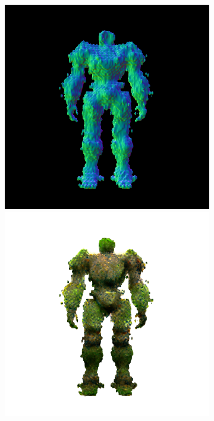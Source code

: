 \begin{figure}[ht]
\begin{subfigure}[b]{0.222\textwidth}
        \includegraphics[width=\textwidth]{etc/a robot made out of plants/magic123/magic123_refine_robot_back_0_part2.png}
        \includegraphics[width=\textwidth]{etc/a robot made out of plants/magic123/magic123_refine_robot_back_0_part1.png}

\end{subfigure}
\end{figure}
